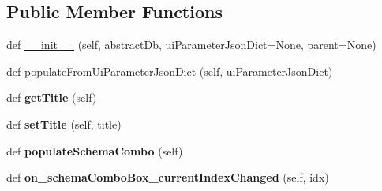 \subsection*{Public Member Functions}
\begin{DoxyCompactItemize}
\item 
def \mbox{\hyperlink{class_dsg_tools_1_1_custom_widgets_1_1_custom_db_management_widgets_1_1new_attribute_widget_1_1_new_attribute_widget_abeae33f72fc1c429774df806361868ad}{\+\_\+\+\_\+init\+\_\+\+\_\+}} (self, abstract\+Db, ui\+Parameter\+Json\+Dict=None, parent=None)
\item 
def \mbox{\hyperlink{class_dsg_tools_1_1_custom_widgets_1_1_custom_db_management_widgets_1_1new_attribute_widget_1_1_new_attribute_widget_a5e18f5473b9c2210a03b1b9afc55fb03}{populate\+From\+Ui\+Parameter\+Json\+Dict}} (self, ui\+Parameter\+Json\+Dict)
\item 
\mbox{\label{class_dsg_tools_1_1_custom_widgets_1_1_custom_db_management_widgets_1_1new_attribute_widget_1_1_new_attribute_widget_a920e2186a94e7bfb61944d90dc8e66ef}} 
def {\bfseries get\+Title} (self)
\item 
\mbox{\label{class_dsg_tools_1_1_custom_widgets_1_1_custom_db_management_widgets_1_1new_attribute_widget_1_1_new_attribute_widget_a6d161145e43589dc8d2b64dd41f47ab2}} 
def {\bfseries set\+Title} (self, title)
\item 
\mbox{\label{class_dsg_tools_1_1_custom_widgets_1_1_custom_db_management_widgets_1_1new_attribute_widget_1_1_new_attribute_widget_a43f071f92f77e8909ae9f8e8e11c4a11}} 
def {\bfseries populate\+Schema\+Combo} (self)
\item 
\mbox{\label{class_dsg_tools_1_1_custom_widgets_1_1_custom_db_management_widgets_1_1new_attribute_widget_1_1_new_attribute_widget_a75846e4d0b9c6972eb29a30019049604}} 
def {\bfseries on\+\_\+schema\+Combo\+Box\+\_\+current\+Index\+Changed} (self, idx)
\item 

\end{DoxyCompactItemize}
